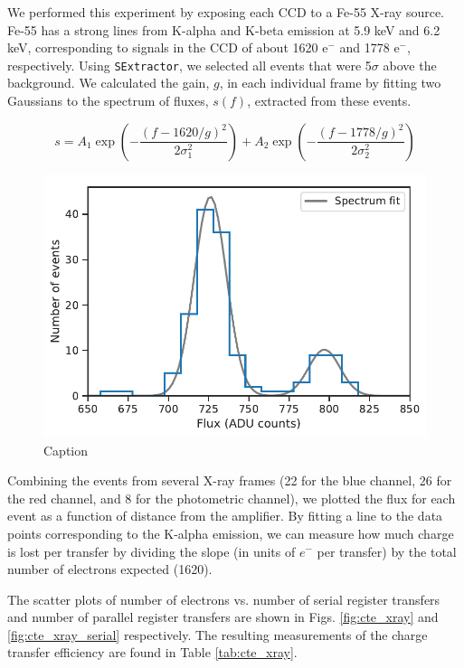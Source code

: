 We performed this experiment by exposing each CCD to a Fe-55 X-ray source. Fe-55 has a strong lines from K-alpha and K-beta emission at 5.9 keV and 6.2 keV, corresponding to signals in the CCD of about 1620 $\textrm{e}^-$ and 1778 $\textrm{e}^-$, respectively. Using \verb|SExtractor|, we selected all events that were 5$\sigma$ above the background. We calculated the gain, $g$, in each individual frame by fitting two Gaussians to the spectrum of fluxes, $s(f)$, extracted from these events.

\begin{equation}
    s = A_1 \exp\left(-\frac{(f-1620/g)^2}{2\sigma_1^2}\right) + A_2 \exp\left(-\frac{(f-1778/g)^2}{2\sigma_2^2}\right)
\end{equation}

\begin{figure}
    \centering
    \includegraphics{figures/cte/spectrum_fit.pdf}
    \caption{Caption}
    \label{fig:xray_spectrum}
\end{figure}

Combining the events from several X-ray frames (22 for the blue channel, 26 for the red channel, and 8 for the photometric channel), we plotted the flux for each event as a function of distance from the amplifier. By fitting a line to the data points corresponding to the K-alpha emission, we can measure how much charge is lost per transfer by dividing the slope (in units of $e^-$ per transfer) by the total number of electrons expected (1620).

The scatter plots of number of electrons vs. number of serial register transfers and number of parallel register transfers are shown in Figs. \ref{fig:cte_xray} and \ref{fig:cte_xray_serial} respectively. The resulting measurements of the charge transfer efficiency are found in Table \ref{tab:cte_xray}.


